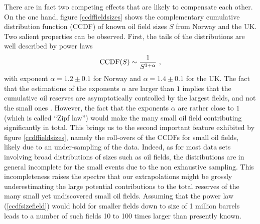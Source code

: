 \documentclass[review]{elsarticle}
\begin{document}
There are in fact two competing effects that are likely to compensate each other.
On the one hand, figure \ref{ccdffieldsizes} shows the complementary 
cumulative distribution function (CCDF) of known oil field sizes $S$ from Norway and the UK.
Two salient properties can be observed. First, the tails 
of the distributions are well described by power laws
\begin{equation}
{\rm CCDF}(S) \sim {1 \over S^{1+\alpha}}~,
\label{ccdfsizefield}
\end{equation}
with exponent $\alpha = 1.2 \pm 0.1$ for Norway and $\alpha = 1.4 \pm 0.1$ for the UK.
The fact that the estimations of the exponents $\alpha$ are larger than $1$ implies
that the cumulative oil reserves are asymptotically controlled by the largest fields, and not the small ones
\citep{Sornette2004}. However, the fact that the exponents $\alpha$ are rather close
to $1$ (which is called ``Zipf law'') would make the many small oil field contributing 
significantly in total. This brings us to the second important feature exhibited by figure \ref{ccdffieldsizes},
namely the roll-overs of the CCDFs for small oil fields, likely due to an under-sampling
of the data. Indeed, as for most data sets involving broad distributions of sizes such
as oil fields, the distributions are in general incomplete for the small events due to the non
exhaustive sampling. This incompleteness raises the spectre that our extrapolations
might be grossly underestimating the large potential contributions to the total reserves
of the many small yet undiscovered small oil fields. Assuming that the power law (\ref{ccdfsizefield})
would hold for smaller fields down to size of 1 million barrels leads to a number of 
such fields 10 to 100 times larger than presently known. 
\end{document}
